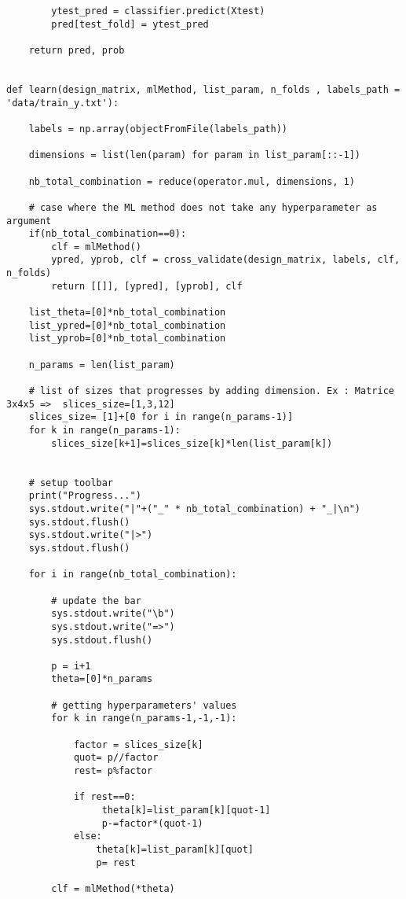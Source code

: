 \documentclass{article}
\begin{document}
\begin{lstlisting}
        ytest_pred = classifier.predict(Xtest)
        pred[test_fold] = ytest_pred
        
    return pred, prob


def learn(design_matrix, mlMethod, list_param, n_folds , labels_path = 'data/train_y.txt'):
    
    labels = np.array(objectFromFile(labels_path))

    dimensions = list(len(param) for param in list_param[::-1])

    nb_total_combination = reduce(operator.mul, dimensions, 1)
    
    # case where the ML method does not take any hyperparameter as argument
    if(nb_total_combination==0):
        clf = mlMethod()
        ypred, yprob, clf = cross_validate(design_matrix, labels, clf, n_folds)
        return [[]], [ypred], [yprob], clf
    
    list_theta=[0]*nb_total_combination
    list_ypred=[0]*nb_total_combination
    list_yprob=[0]*nb_total_combination
    
    n_params = len(list_param)
    
    # list of sizes that progresses by adding dimension. Ex : Matrice 3x4x5 =>  slices_size=[1,3,12]
    slices_size= [1]+[0 for i in range(n_params-1)]
    for k in range(n_params-1):
        slices_size[k+1]=slices_size[k]*len(list_param[k])
    
    
    # setup toolbar
    print("Progress...")
    sys.stdout.write("|"+("_" * nb_total_combination) + "_|\n")
    sys.stdout.flush()
    sys.stdout.write("|>")
    sys.stdout.flush()
    
    for i in range(nb_total_combination):

        # update the bar
        sys.stdout.write("\b")
        sys.stdout.write("=>")
        sys.stdout.flush()
        
        p = i+1
        theta=[0]*n_params
        
        # getting hyperparameters' values
        for k in range(n_params-1,-1,-1):
            
            factor = slices_size[k]
            quot= p//factor
            rest= p%factor
             
            if rest==0:
                 theta[k]=list_param[k][quot-1]
                 p-=factor*(quot-1)
            else:
                theta[k]=list_param[k][quot]
                p= rest

        clf = mlMethod(*theta)


\end{lstlisting}
\end{document}
